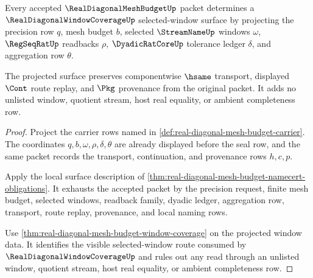\begin{theorem}
\label{thm:real-diagonal-mesh-budget-window-refinement}
Every accepted $\RealDiagonalMeshBudgetUp$ packet determines a $\RealDiagonalWindowCoverageUp$ selected-window surface by projecting the precision row $q$, mesh budget $b$, selected $\StreamNameUp$ windows $\omega$, $\RegSeqRatUp$ readbacks $\rho$, $\DyadicRatCoreUp$ tolerance ledger $\delta$, and aggregation row $\theta$.

The projected surface preserves componentwise $\hsame$ transport, displayed $\Cont$ route replay, and $\Pkg$ provenance from the original packet. It adds no unlisted window, quotient stream, host real equality, or ambient completeness row.
\end{theorem}
\begin{proof}
Project the carrier rows named in \autoref{def:real-diagonal-mesh-budget-carrier}. The coordinates $q,b,\omega,\rho,\delta,\theta$ are already displayed before the seal row, and the same packet records the transport, continuation, and provenance rows $h,c,p$.

Apply the local surface description of \autoref{thm:real-diagonal-mesh-budget-namecert-obligations}. It exhausts the accepted packet by the precision request, finite mesh budget, selected windows, readback family, dyadic ledger, aggregation row, transport, route replay, provenance, and local naming rows.

Use \autoref{thm:real-diagonal-mesh-budget-window-coverage} on the projected window data. It identifies the visible selected-window route consumed by $\RealDiagonalWindowCoverageUp$ and rules out any read through an unlisted window, quotient stream, host real equality, or ambient completeness row.
\end{proof}

